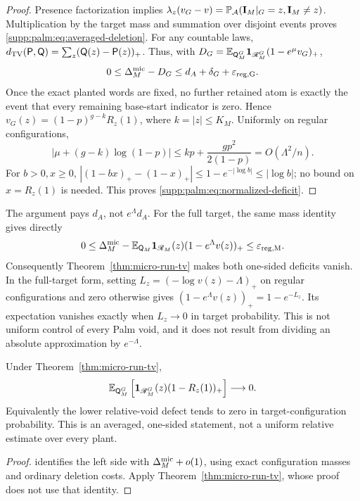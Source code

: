 \begin{proof}
Presence factorization implies
$\lambda_z(v_G-v)=\mathbb P_{\mathcal A}(\mathbf I_M|_G=z,\mathbf I_M\ne z)$.
Multiplication by the target mass and summation over disjoint events proves
\eqref{supp:palm:eq:averaged-deletion}. For any countable laws,
$d_{\mathrm{TV}}(\mathsf P,\mathsf Q)=\sum_z(\mathsf Q(z)-\mathsf P(z))_+$.
Thus, with
$D_G=\mathbb E_{\mathsf Q_M^G}\mathbf 1_{\mathscr R_M^G}(1-e^\mu v_G)_+$,
\[
 0\le\Delta_M^{\rm mic}-D_G\le d_A+\delta_G+\varepsilon_{\rm reg,G}.
\]
Once the exact planted words are fixed, no further retained atom is exactly the event that every remaining base-start indicator is zero. Hence
$v_G(z)=(1-p)^{g-k}R_z(1)$, where $k=|z|\le K_M$.
Uniformly on regular configurations,
\[
 |\mu+(g-k)\log(1-p)|
     \le kp+\frac{gp^2}{2(1-p)}=O(\Lambda^2/n).
\]
For $b>0,x\ge0$,
$|(1-bx)_+-(1-x)_+|\le1-e^{-|\log b|}\le|\log b|$;
no bound on $x=R_z(1)$ is needed. This proves \eqref{supp:palm:eq:normalized-deficit}.
\end{proof}
The argument pays $d_A$, not $e^\Lambda d_A$. For the full target, the same mass identity gives directly
\[
 0\le\Delta_M^{\rm mic}
   -\mathbb E_{\mathsf Q_M}\mathbf 1_{\mathscr R_M}(z)(1-e^\Lambda v(z))_+
   \le\varepsilon_{\rm reg,M}.
\]
Consequently Theorem~\ref{thm:micro-run-tv} makes both one-sided deficits vanish. In the full-target form, setting
$L_z=(-\log v(z)-\Lambda)_+$ on regular configurations and zero otherwise gives
$(1-e^\Lambda v(z))_+=1-e^{-L_z}$. Its expectation vanishes exactly when $L_z\to0$ in target probability. This is not uniform control of every Palm void, and it does not result from dividing an absolute approximation by $e^{-\Lambda}$.

\begin{corollary}\label{supp:palm:cor:palm-completion}
Under Theorem~\ref{thm:micro-run-tv},
\begin{equation}\label{supp:palm:eq:palm-completion}
 \mathbb E_{\mathsf Q^G_M}\left[
        \mathbf 1_{\mathscr R^G_M}(z)(1-R_z(1))_+\right]\longrightarrow0.
\end{equation}
Equivalently the lower relative-void defect tends to zero in target-configuration probability. This is an averaged, one-sided statement, not a uniform relative estimate over every plant.
\end{corollary}
\begin{proof}
 identifies the left side with
$\Delta_M^{\rm mic}+o(1)$, using exact configuration masses and ordinary deletion costs. Apply Theorem~\ref{thm:micro-run-tv}, whose proof does not use that identity.
\end{proof}

